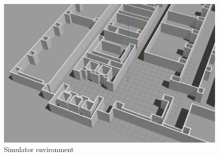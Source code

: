 \begin{figure}[H]
  \centering
 \includegraphics[keepaspectratio, scale=0.15]
      {images/sim-env.png}
\caption{Simulator environment}
 \label{Fig:sim-env}
\end{figure} 

\vspace{-10pt}

